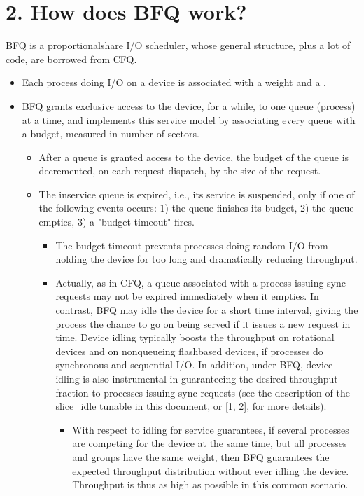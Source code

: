 \documentclass[a4paper,11pt,english]{sphinxmanual}
\begin{document}
\section{2. How does BFQ work?}
\label{\detokenize{bfq-iosched:how-does-bfq-work}}
BFQ is a proportional\sphinxhyphen{}share I/O scheduler, whose general structure,
plus a lot of code, are borrowed from CFQ.
\begin{itemize}
\item {} 
Each process doing I/O on a device is associated with a weight and a
.

\item {} 
BFQ grants exclusive access to the device, for a while, to one queue
(process) at a time, and implements this service model by
associating every queue with a budget, measured in number of
sectors.
\begin{itemize}
\item {} 
After a queue is granted access to the device, the budget of the
queue is decremented, on each request dispatch, by the size of the
request.

\item {} 
The in\sphinxhyphen{}service queue is expired, i.e., its service is suspended,
only if one of the following events occurs: 1) the queue finishes
its budget, 2) the queue empties, 3) a "budget timeout" fires.
\begin{itemize}
\item {} 
The budget timeout prevents processes doing random I/O from
holding the device for too long and dramatically reducing
throughput.

\item {} 
Actually, as in CFQ, a queue associated with a process issuing
sync requests may not be expired immediately when it empties. In
contrast, BFQ may idle the device for a short time interval,
giving the process the chance to go on being served if it issues
a new request in time. Device idling typically boosts the
throughput on rotational devices and on non\sphinxhyphen{}queueing flash\sphinxhyphen{}based
devices, if processes do synchronous and sequential I/O. In
addition, under BFQ, device idling is also instrumental in
guaranteeing the desired throughput fraction to processes
issuing sync requests (see the description of the slice\_idle
tunable in this document, or {[}1, 2{]}, for more details).
\begin{itemize}
\item {} 
With respect to idling for service guarantees, if several
processes are competing for the device at the same time, but
all processes and groups have the same weight, then BFQ
guarantees the expected throughput distribution without ever
idling the device. Throughput is thus as high as possible in
this common scenario.


\end{itemize}
\end{itemize}
\end{itemize}
\end{itemize}
\end{document}
